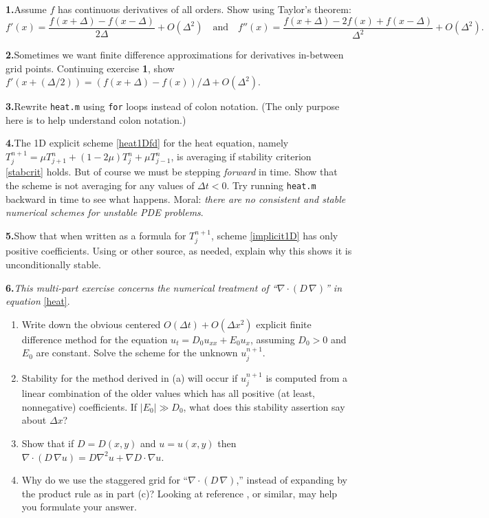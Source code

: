 \documentclass[letterpaper,final,12pt,reqno]{amsart}
\newcommand{\grad}{\nabla}
\newcommand{\Div}{\nabla\cdot}
\begin{document}
\newcommand{\exer}[2]{\medskip\noindent \textbf{#1.}\quad #2}

\exer{1}{Assume $f$ has continuous derivatives of all orders.  Show using Taylor's theorem:
  $$f'(x) = \frac{f(x+\Delta) - f(x-\Delta)}{2\Delta} + O(\Delta^2) \quad \text{and} \quad f''(x) = \frac{f(x+\Delta) - 2 f(x) + f(x-\Delta)}{\Delta^2} + O(\Delta^2).$$}

\exer{2}{Sometimes we want finite difference approximations for derivatives in-between grid points.  Continuing exercise \textbf{1}, show $f'(x+(\Delta/2)) = (f(x+\Delta) - f(x))/\Delta + O(\Delta^2)$.}

\exer{3}{Rewrite \texttt{heat.m} using \texttt{for} loops instead of colon notation.  (The only purpose here is to help understand colon notation.)}

\exer{4}{The 1D explicit scheme \eqref{heat1Dfd} for the heat equation, namely $T_j^{n+1} = \mu T_{j+1}^n + (1 - 2 \mu) T_j^n + \mu T_{j-1}^n$, is averaging if stability criterion \eqref{stabcrit} holds.  But of course we must be stepping \emph{forward} in time.  Show that the scheme is not averaging for any values of $\Delta t < 0$.  Try running \texttt{heat.m} backward in time to see what happens.  Moral: \emph{there are no consistent and stable numerical schemes for unstable PDE problems}.}

\exer{5}{Show that when written as a formula for $T_j^{n+1}$, scheme \eqref{implicit1D} has only positive coefficients.  Using \cite{MortonMayers} or other source, as needed, explain why this shows it is unconditionally stable.}

\exer{6}{\emph{This multi-part exercise concerns the numerical treatment of ``$\Div\left(D\,\grad\right)$'' in equation} \eqref{heat}. 
\renewcommand{\labelenumi}{(\alph{enumi})}
\begin{enumerate}
\item Write down the obvious centered $O(\Delta t)+O(\Delta x^2)$ explicit finite difference method for the equation $u_t = D_0 u_{xx} + E_0 u_x$, assuming $D_0>0$ and $E_0$ are constant.  Solve the scheme for the unknown $u_j^{n+1}$. 
\item Stability for the method derived in (a) will occur if $u_j^{n+1}$ is computed from a linear combination of the older values which has all positive (at least, nonnegative) coefficients.  If $|E_0| \gg D_0$, what does this stability assertion say about $\Delta x$?
\item Show that if $D=D(x,y)$ and $u=u(x,y)$ then $\Div \left(D\, \grad u\right) = D \grad^2 u + \grad D \cdot \grad u$.
\item Why do we use the staggered grid for ``$\Div\left(D\,\grad\right)$,'' instead of expanding by the product rule as in part (c)?  Looking at reference \cite{MortonMayers}, or similar, may help you formulate your answer.
\end{enumerate}
}
\end{document}
